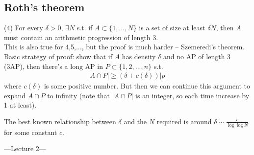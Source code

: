 \documentclass[a4paper]{article}
\begin{document}
\subsection{Roth's theorem}
\begin{thm} (4)
    For every $\delta > 0$, $\exists N$ s.t. if $A \subset \{1,...,N\}$ is a set of size at least $\delta N$, then $A$ must contain an arithmetic progression of length 3.\\
    This is also true for 4,5,..., but the proof is much harder -- Szemeredi's theorem.\\
    Basic strategy of proof: show that if $A$ has density $\delta$ and no AP of length 3 (3AP), then there's a long AP in $P \subset \{1,2,...,n\}$ s.t.
    \begin{equation*}
        \begin{aligned}
            |A \cap P| \geq (\delta+c(\delta)) |p|
        \end{aligned}
    \end{equation*}
    where $c(\delta)$ is some positive number. But then we can continue this argument to expand $A\cap P$ to infinity (note that $|A\cap P|$ is an integer, so each time increase by 1 at least).

    The best known relationship between $\delta$ and the $N$ required is around $\delta \sim \frac{c}{\log\log N}$ for some constant $c$.
\end{thm}

---Lecture 2---
\end{document}
